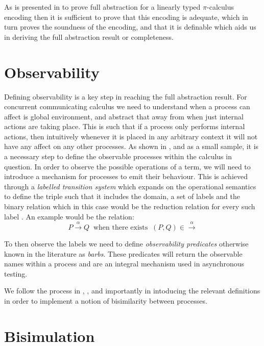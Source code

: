 As is presented in \citep{demangeon2011full} to prove full abstraction for a linearly typed $\pi$-calculus encoding then it is sufficient to prove that this encoding is adequate, which in turn proves the soundness of the encoding, and that it is definable which aids us in deriving the full abstraction result or completeness.
\section{Observability}\label{Observability}

Defining observability is a key step in reaching the full abstraction result. For concurrent communicating calculus we need to understand when a process can affect is global environment, and abstract that away from when just internal actions are taking place. This is such that if a process only performs internal actions, then intuitively whenever it is placed in any arbitrary context it will not have any affect on any other processes. As shown in \citep{demangeon2011full}, \citep{jeffrey2005full} and \citep{bucciarelli2011full} as a small sample, it is a necessary step to define the observable processes within the calculus in question. In order to observe the possible operations of a term, we will need to introduce a mechanism for processes to emit their behaviour. This is achieved through a \textit{labelled transition system} which expands on the operational semantics to define the triple such that it includes the domain, a set of labels and the binary relation which in this case would be the reduction relation for every such label \cite{BAETEN2014399}. An example would be the relation:
\begin{equation*}
    P \xrightarrow{\alpha} Q \: \text{ when there exists } \: (P, Q) \in \xrightarrow{\alpha} 
\end{equation*}

To then observe the labels we need to define \textit{observability predicates} otherwise known in the literature \cite{sangiorgi2003pi} as \textit{barbs}. These predicates will return the observable names within a process and are an integral mechanism used in asynchronous testing.

We follow the process in \citep{milner1992barbed}, \citep{sangiorgi2001barbed}, \citep{sangiorgi2003pi} and importantly \citep{demangeon2011full} in intoducing the relevant definitions in order to implement a notion of bisimilarity between processes.

\section{Bisimulation}\label{BisimulationSection}

